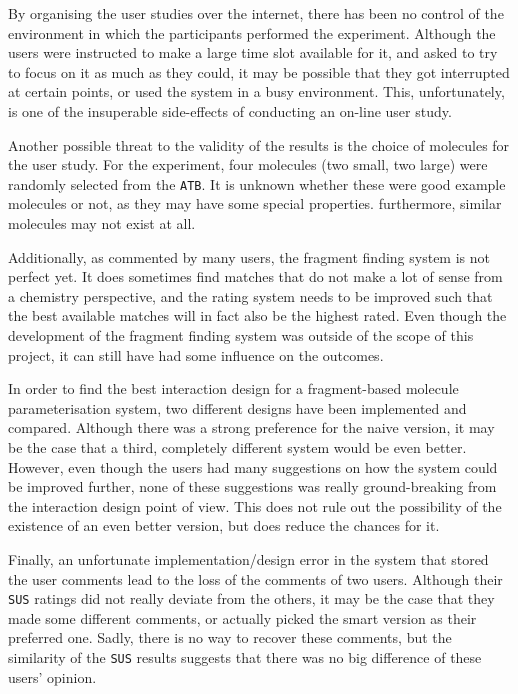 By organising the user studies over the internet, there has been no control of the environment in which the participants performed the experiment. Although the users were instructed to make a large time slot available for it, and asked to try to focus on it as much as they could, it may be possible that they got interrupted at certain points, or used the system in a busy environment. This, unfortunately, is one of the insuperable side-effects of conducting an on-line user study.

Another possible threat to the validity of the results is the choice of molecules for the user study. For the experiment, four molecules (two small, two large) were randomly selected from the \verb|ATB|. It is unknown whether these were good example molecules or not, as they may have some special properties. furthermore, similar molecules may not exist at all.

Additionally, as commented by many users, the fragment finding system is not perfect yet. It does sometimes find matches that do not make a lot of sense from a chemistry perspective, and the rating system needs to be improved such that the best available matches will in fact also be the highest rated. Even though the development of the fragment finding system was outside of the scope of this project, it can still have had some influence on the outcomes.

In order to find the best interaction design for a fragment-based molecule parameterisation system, two different designs have been implemented and compared. Although there was a strong preference for the naive version, it may be the case that a third, completely different system would be even better. However, even though the users had many suggestions on how the system could be improved further, none of these suggestions was really ground-breaking from the interaction design point of view. This does not rule out the possibility of the existence of an even better version, but does reduce the chances for it.

Finally, an unfortunate implementation/design error in the system that stored the user comments lead to the loss of the comments of two users. Although their \verb|SUS| ratings did not really deviate from the others, it may be the case that they made some different comments, or actually picked the smart version as their preferred one. Sadly, there is no way to recover these comments, but the similarity of the \verb|SUS| results suggests that there was no big difference of these users' opinion.


